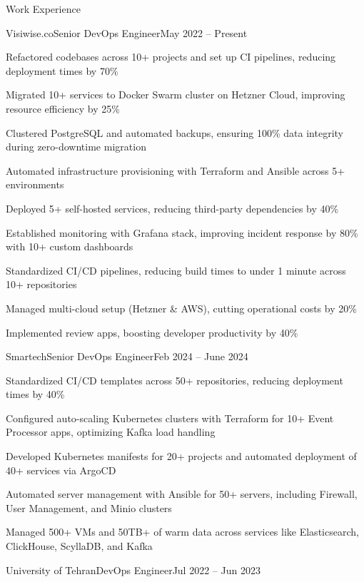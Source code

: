 \documentclass[]{main}
\begin{document}
\newpage

\begin{section}{Work Experience}
 \begin{subsection}{Visiwise.co}{Senior DevOps Engineer}{May 2022 -- Present}{}
     \item Refactored codebases across 10+ projects and set up CI pipelines, reducing deployment times by 70\%
     \item Migrated 10+ services to Docker Swarm cluster on Hetzner Cloud, improving resource efficiency by 25\%
     \item Clustered PostgreSQL and automated backups, ensuring 100\% data integrity during zero-downtime migration
     \item Automated infrastructure provisioning with Terraform and Ansible across 5+ environments
     \item Deployed 5+ self-hosted services, reducing third-party dependencies by 40\%
     \item Established monitoring with Grafana stack, improving incident response by 80\% with 10+ custom dashboards
     \item Standardized CI/CD pipelines, reducing build times to under 1 minute across 10+ repositories
     \item Managed multi-cloud setup (Hetzner \& AWS), cutting operational costs by 20\%
     \item Implemented review apps, boosting developer productivity by 40\%
 \end{subsection}
 \begin{subsection}{Smartech}{Senior DevOps Engineer}{Feb 2024 -- June 2024}{}
     \item Standardized CI/CD templates across 50+ repositories, reducing deployment times by 40\%
     \item Configured auto-scaling Kubernetes clusters with Terraform for 10+ Event Processor apps, optimizing Kafka load handling
     \item Developed Kubernetes manifests for 20+ projects and automated deployment of 40+ services via ArgoCD
     \item Automated server management with Ansible for 50+ servers, including Firewall, User Management, and Minio clusters
     \item Managed 500+ VMs and 50TB+ of warm data across services like Elasticsearch, ClickHouse, ScyllaDB, and Kafka
 \end{subsection}
 \begin{subsection}{University of Tehran}{DevOps Engineer}{Jul 2022 -- Jun 2023}{}

\end{subsection}
\end{section}
\end{document}
